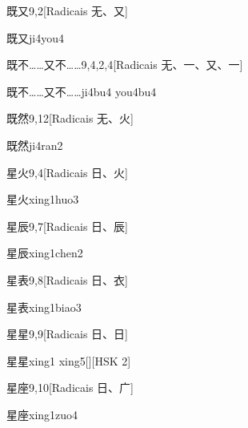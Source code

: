 \begin{entry}{既又}{9,2}[Radicais ⽆、⼜]
  \begin{phonetics}{既又}{ji4you4}
  \end{phonetics}
\end{entry}

\begin{entry}{既不……又不……}{9,4,2,4}[Radicais ⽆、⼀、⼜、⼀]
  \begin{phonetics}{既不……又不……}{ji4bu4 you4bu4}
  \end{phonetics}
\end{entry}

\begin{entry}{既然}{9,12}[Radicais ⽆、⽕]
  \begin{phonetics}{既然}{ji4ran2}
  \end{phonetics}
\end{entry}

\begin{entry}{星火}{9,4}[Radicais ⽇、⽕]
  \begin{phonetics}{星火}{xing1huo3}
  \end{phonetics}
\end{entry}

\begin{entry}{星辰}{9,7}[Radicais ⽇、⾠]
  \begin{phonetics}{星辰}{xing1chen2}
  \end{phonetics}
\end{entry}

\begin{entry}{星表}{9,8}[Radicais ⽇、⾐]
  \begin{phonetics}{星表}{xing1biao3}
  \end{phonetics}
\end{entry}

\begin{entry}{星星}{9,9}[Radicais ⽇、⽇]
  \begin{phonetics}{星星}{xing1 xing5}[][HSK 2]
  \end{phonetics}
\end{entry}

\begin{entry}{星座}{9,10}[Radicais ⽇、⼴]
  \begin{phonetics}{星座}{xing1zuo4}
  \end{phonetics}
\end{entry}

